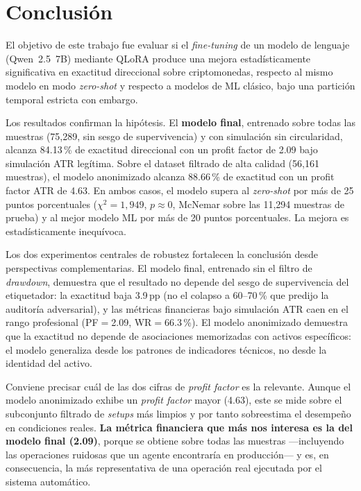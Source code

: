 \documentclass[10pt,twocolumn]{article}
\begin{document}
\section{Conclusi\'on}

El objetivo de este trabajo fue evaluar si el \textit{fine-tuning} de un modelo de lenguaje (Qwen~2.5~7B) mediante QLoRA produce una mejora estad\'isticamente significativa en exactitud direccional sobre criptomonedas, respecto al mismo modelo en modo \textit{zero-shot} y respecto a modelos de ML cl\'asico, bajo una partici\'on temporal estricta con embargo.

Los resultados confirman la hip\'otesis. El \textbf{modelo final}, entrenado sobre todas las muestras (75,289, sin sesgo de supervivencia) y con simulaci\'on sin circularidad, alcanza 84.13\,\% de exactitud direccional con un profit factor de 2.09 bajo simulaci\'on ATR leg\'itima. Sobre el dataset filtrado de alta calidad (56,161 muestras), el modelo anonimizado alcanza 88.66\,\% de exactitud con un profit factor ATR de 4.63. En ambos casos, el modelo supera al \textit{zero-shot} por m\'as de 25 puntos porcentuales ($\chi^2 = 1{,}949$, $p\approx0$, McNemar sobre las 11,294 muestras de prueba) y al mejor modelo ML por m\'as de 20 puntos porcentuales. La mejora es estad\'isticamente inequ\'ivoca.

Los dos experimentos centrales de robustez fortalecen la conclusi\'on desde perspectivas complementarias. El modelo final, entrenado sin el filtro de \textit{drawdown}, demuestra que el resultado no depende del sesgo de supervivencia del etiquetador: la exactitud baja 3.9\,pp (no el colapso a 60--70\,\% que predijo la auditor\'ia adversarial), y las m\'etricas financieras bajo simulaci\'on ATR caen en el rango profesional (PF$=$2.09, WR$=$66.3\,\%). El modelo anonimizado demuestra que la exactitud no depende de asociaciones memorizadas con activos espec\'ificos: el modelo generaliza desde los patrones de indicadores t\'ecnicos, no desde la identidad del activo.

Conviene precisar cu\'al de las dos cifras de \textit{profit factor} es la relevante. Aunque el modelo anonimizado exhibe un \textit{profit factor} mayor (4.63), este se mide sobre el subconjunto filtrado de \textit{setups} m\'as limpios y por tanto sobreestima el desempe\~no en condiciones reales. \textbf{La m\'etrica financiera que m\'as nos interesa es la del modelo final (2.09)}, porque se obtiene sobre todas las muestras ---incluyendo las operaciones ruidosas que un agente encontrar\'ia en producci\'on--- y es, en consecuencia, la m\'as representativa de una operaci\'on real ejecutada por el sistema autom\'atico.
\end{document}
